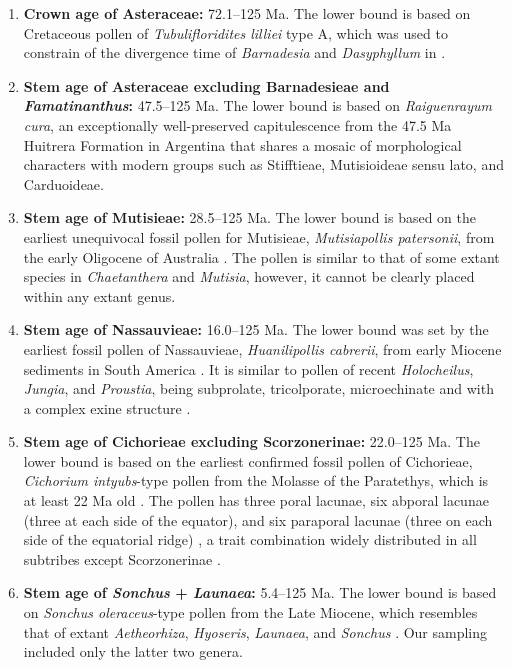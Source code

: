 \documentclass[10pt]{article}
\begin{document}
\begin{enumerate}

\item \textbf{Crown age of Asteraceae:} 72.1--125 Ma. The lower bound
  is based on Cretaceous pollen of \textit{Tubulifloridites lilliei}
  type A, which was used to constrain of the divergence time of
  \textit{Barnadesia} and \textit{Dasyphyllum} in
  \cite{Barreda2015}.

\item \textbf{Stem age of Asteraceae excluding Barnadesieae and
    \textit{Famatinanthus}:} 47.5--125 Ma. The lower bound is based
  on \textit{Raiguenrayum cura}, an exceptionally well-preserved
  capitulescence from the 47.5 Ma Huitrera Formation in Argentina
  \citep{Barreda2010,Barreda2012} that shares a mosaic of
  morphological characters with modern groups such as Stifftieae,
  Mutisioideae sensu lato, and Carduoideae.

\item \textbf{Stem age of Mutisieae:} 28.5--125 Ma. The lower bound
  is based on the earliest unequivocal fossil pollen for Mutisieae,
  \textit{Mutisiapollis patersonii}, from the early Oligocene of
  Australia \citep{Macphail1994}. The pollen is similar to that of
  some extant species in \textit{Chaetanthera} and \textit{Mutisia},
  however, it cannot be clearly placed within any extant genus.

\item \textbf{Stem age of Nassauvieae:} 16.0--125 Ma. The lower
  bound was set by the earliest fossil pollen of Nassauvieae,
  \textit{Huanilipollis cabrerii}, from early Miocene sediments in
  South America \citep{Barreda2008,Barreda2010}. It is similar to
  pollen of recent \textit{Holocheilus}, \textit{Jungia}, and
  \textit{Proustia}, being subprolate, tricolporate, microechinate and
  with a complex exine structure \citep{Barreda2008}.

\item \textbf{Stem age of Cichorieae excluding Scorzonerinae:}
  22.0--125 Ma. The lower bound is based on the earliest confirmed
  fossil pollen of Cichorieae, \textit{Cichorium intyubs}-type pollen
  from the Molasse of the Paratethys, which is at least 22 Ma old
  \citep{Hochuli1978}. The pollen has three poral lacunae, six abporal
  lacunae (three at each side of the equator), and six paraporal
  lacunae (three on each side of the equatorial ridge)
  \citep{Blackmore1984}, a trait combination widely distributed in all
  subtribes except Scorzonerinae \citep{Tremetsberger2013}.

\item \textbf{Stem age of \textit{Sonchus} + \textit{Launaea}:}
  5.4--125 Ma. The lower bound is based on \textit{Sonchus
    oleraceus}-type pollen from the Late Miocene, which resembles that
  of extant \textit{Aetheorhiza}, \textit{Hyoseris}, \textit{Launaea},
  and \textit{Sonchus} \citep{Blackmore1986}. Our sampling included
  only the latter two genera.

\end{enumerate}
\end{document}
